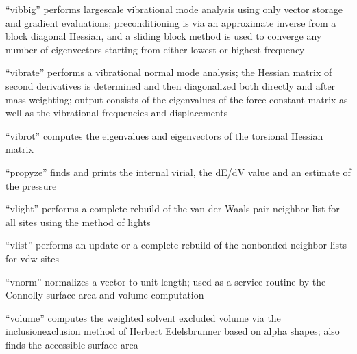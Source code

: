 \documentclass[letterpaper,11pt,english]{sphinxmanual}
\begin{document}
\sphinxAtStartPar
{}

\sphinxAtStartPar
“vibbig” performs large\sphinxhyphen{}scale vibrational mode analysis using only vector storage and gradient evaluations; preconditioning is via an approximate inverse from a block diagonal Hessian, and a sliding block method is used to converge any number of eigenvectors starting from either lowest or highest frequency

\sphinxAtStartPar
{}

\sphinxAtStartPar
“vibrate” performs a vibrational normal mode analysis; the Hessian matrix of second derivatives is determined and then diagonalized both directly and after mass weighting; output consists of the eigenvalues of the force constant matrix as well as the vibrational frequencies and displacements

\sphinxAtStartPar
{}

\sphinxAtStartPar
“vibrot” computes the eigenvalues and eigenvectors of the torsional Hessian matrix

\sphinxAtStartPar
{}

\sphinxAtStartPar
“propyze” finds and prints the internal virial, the dE/dV value and an estimate of the pressure

\sphinxAtStartPar
{}

\sphinxAtStartPar
“vlight” performs a complete rebuild of the van der Waals pair neighbor list for all sites using the method of lights

\sphinxAtStartPar
{}

\sphinxAtStartPar
“vlist” performs an update or a complete rebuild of the nonbonded neighbor lists for vdw sites

\sphinxAtStartPar
{}

\sphinxAtStartPar
“vnorm” normalizes a vector to unit length; used as a service routine by the Connolly surface area and volume computation

\sphinxAtStartPar
{}

\sphinxAtStartPar
“volume” computes the weighted solvent excluded volume via the inclusion\sphinxhyphen{}exclusion method of Herbert Edelsbrunner based on alpha shapes; also finds the accessible surface area

\sphinxAtStartPar
{}
\end{document}
